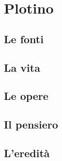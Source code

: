 \chapter{Plotino}

\section{Le fonti}

\section{La vita}

\section{Le opere}

\section{Il pensiero}

\section{L'eredità}
